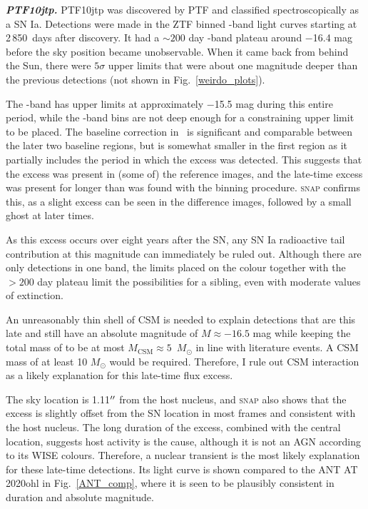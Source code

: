 \documentclass[a4paper,oneside,12pt, class=Latex/Classes/PhDthesisPSnPDF, crop=false]{standalone}
\begin{document}
\textit{\textbf{PTF10jtp.}}
PTF10jtp was discovered by PTF and classified spectroscopically as a SN Ia. Detections were made in the ZTF binned \ztfr-band light curves starting at 2\,850~days after discovery. It had a $\sim 200$ day \ztfr-band plateau around $-$16.4 mag before the sky position became unobservable. When it came back from behind the Sun, there were $5\sigma$ upper limits that were about one magnitude deeper than the previous detections (not shown in Fig.~\ref{weirdo_plots}).

The \ztfg-band has upper limits at approximately $-$15.5 mag during this entire period, while the \ztfi-band bins are not deep enough for a constraining upper limit to be placed. The baseline correction in \ztfr\ is significant and comparable between the later two baseline regions, but is somewhat smaller in the first region as it partially includes the period in which the excess was detected. This suggests that the excess was present in (some of) the reference images, and the late-time excess was present for longer than was found with the binning procedure. \textsc{snap} confirms this, as a slight excess can be seen in the difference images, followed by a small ghost at later times.

As this excess occurs over eight years after the SN, any SN Ia radioactive tail contribution at this magnitude can immediately be ruled out. Although there are only detections in one band, the limits placed on the colour together with the $>200$ day plateau limit the possibilities for a sibling, even with moderate values of extinction.

An unreasonably thin shell of CSM is needed to explain detections that are this late and still have an absolute magnitude of $M \approx -16.5$ mag while keeping the total mass of to be at most $M_\text{CSM} \approx 5$~$M_\odot$ in line with literature events. A CSM mass of at least 10 $M_\odot$ would be required. Therefore, I rule out CSM interaction as a likely explanation for this late-time flux excess.

The sky location is 1.11$^{\prime\prime}$ from the host nucleus, and \textsc{snap} also shows that the excess is slightly offset from the SN location in most frames and consistent with the host nucleus. The long duration of the excess, combined with the central location, suggests host activity is the cause, although it is not an AGN according to its WISE colours. Therefore, a nuclear transient is the most likely explanation for these late-time detections. Its light curve is shown compared to the ANT AT 2020ohl in Fig.~\ref{ANT_comp}, where it is seen to be plausibly consistent in duration and absolute magnitude.\\
\end{document}
